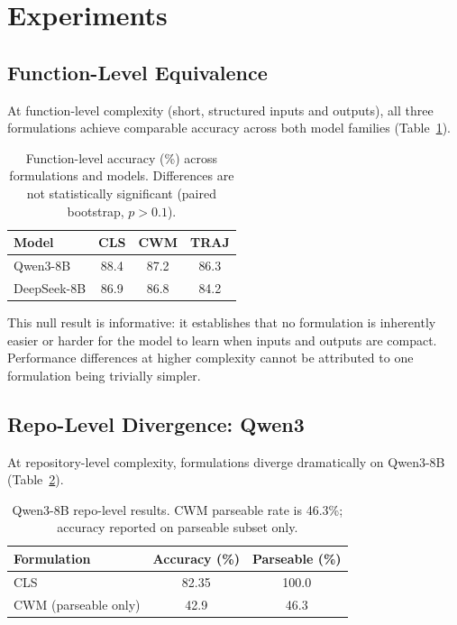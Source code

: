 \documentclass[11pt]{article}
\begin{document}
\section{Experiments}

\subsection{Function-Level Equivalence}

At function-level complexity (short, structured inputs and outputs), all three formulations achieve comparable accuracy across both model families (Table~\ref{tab:func-level}).

\begin{table}[h]
\centering
\caption{Function-level accuracy (\%) across formulations and models. Differences are not statistically significant (paired bootstrap, $p > 0.1$).}
\label{tab:func-level}
\begin{tabular}{lccc}
\toprule
Model & CLS & CWM & TRAJ \\
\midrule
Qwen3-8B & 88.4 & 87.2 & 86.3 \\
DeepSeek-8B & 86.9 & 86.8 & 84.2 \\
\bottomrule
\end{tabular}
\end{table}

This null result is informative: it establishes that no formulation is inherently easier or harder for the model to learn when inputs and outputs are compact. Performance differences at higher complexity cannot be attributed to one formulation being trivially simpler.

\subsection{Repo-Level Divergence: Qwen3}

At repository-level complexity, formulations diverge dramatically on Qwen3-8B (Table~\ref{tab:qwen-repo}).

\begin{table}[h]
\centering
\caption{Qwen3-8B repo-level results. CWM parseable rate is 46.3\%; accuracy reported on parseable subset only.}
\label{tab:qwen-repo}
\begin{tabular}{lcc}
\toprule
Formulation & Accuracy (\%) & Parseable (\%) \\
\midrule
CLS & 82.35 & 100.0 \\
CWM (parseable only) & 42.9 & 46.3 \\
\bottomrule
\end{tabular}
\end{table}
\end{document}
